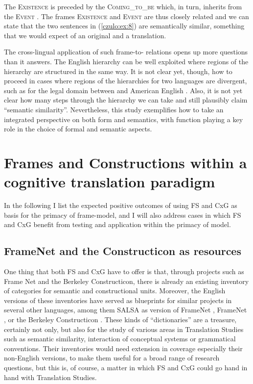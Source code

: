 \documentclass[output=paper]{LSP/langsci}
\begin{document}
The \textsc{Existence}  is preceded by the \textsc{Coming\_to\_be}  which, in turn, inherits from the \textsc{Event} . The frames \textsc{Existence} and \textsc{Event} are thus closely related and we can state that the two sentences in (\ref{czulo:ex:8}) are semantically similar, something that we would expect of an original and a translation.

The cross-lingual application of such frame-to- relations opens up more questions than it answers. The English  hierarchy can be well exploited where regions of the  hierarchy are structured in the same way. It is not clear yet, though, how to proceed in cases where regions of the  hierarchies for two languages are divergent, such as for the legal domain between  and American English \citep{Bertoldi2012}. Also, it is not yet clear how many steps through the  hierarchy we can take and still plausibly claim ``semantic similarity''. Nevertheless, this study exemplifies how to take an integrated perspective on both form and semantics, with function playing a key role in the choice of formal and semantic aspects.

\section{Frames and Constructions within a cognitive translation paradigm}\label{czulo:sec:3}

In the following I list the expected positive outcomes of using FS and CxG as basis for the primacy of frame-model, and I will also address cases in which FS and CxG benefit from testing and application within the primacy of  model.

\subsection{FrameNet and the Constructicon as resources}\label{czulo:sec:3.1}

One thing that both FS and CxG have to offer is that, through projects such as Frame Net and the Berkeley Constructicon, there is already an existing inventory of categories for  semantic and constructional units. Moreover, the English versions of these inventories have served as blueprints for similar projects in several other languages, among them SALSA as  version of FrameNet \citep{Burchardt2006},  FrameNet \citep{Subirats2003}, or the Berkeley Constructicon \citep{Fillmore2012}. These kinds of ``dictionaries'' are a treasure, certainly not only, but also for the study of various areas in Translation Studies such as semantic similarity, interaction of conceptual systems or grammatical conventions. Their inventories would need extension in coverage especially their non-English versions, to make them useful for a broad range of research questions, but this is, of course, a matter in which FS and CxG could go hand in hand with Translation Studies. 
\end{document}
